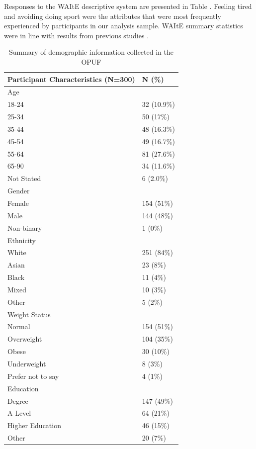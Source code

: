 \documentclass[
  number,
  preprint]{elsarticle}
\begin{document}
Responses to the WAItE descriptive system are presented in Table
\citep{tab-demographic}. Feeling tired and avoiding doing sport were the
attributes that were most frequently experienced by participants in our
analysis sample. WAItE summary statistics were in line with results from
previous studies \citep{Robinson2019EstimatingEvaluation}.

\begin{longtable}[]{@{}ll@{}}

\caption{\label{tbl-demographic}Summary of demographic information
collected in the OPUF}

\tabularnewline

\toprule\noalign{}
Participant Characteristics (N=300) & N (\%) \\
\midrule\noalign{}
\endhead
\bottomrule\noalign{}
\endlastfoot
Age & \\
18-24 & 32 (10.9\%) \\
25-34 & 50 (17\%) \\
35-44 & 48 (16.3\%) \\
45-54 & 49 (16.7\%) \\
55-64 & 81 (27.6\%) \\
65-90 & 34 (11.6\%) \\
Not Stated & 6 (2.0\%) \\
Gender & \\
Female & 154 (51\%) \\
Male & 144 (48\%) \\
Non-binary & 1 (0\%) \\
Ethnicity & \\
White & 251 (84\%) \\
Asian & 23 (8\%) \\
Black & 11 (4\%) \\
Mixed & 10 (3\%) \\
Other & 5 (2\%) \\
Weight Status & \\
Normal & 154 (51\%) \\
Overweight & 104 (35\%) \\
Obese & 30 (10\%) \\
Underweight & 8 (3\%) \\
Prefer not to say & 4 (1\%) \\
Education & \\
Degree & 147 (49\%) \\
A Level & 64 (21\%) \\
Higher Education & 46 (15\%) \\
Other & 20 (7\%) \\

\end{longtable}
\end{document}
